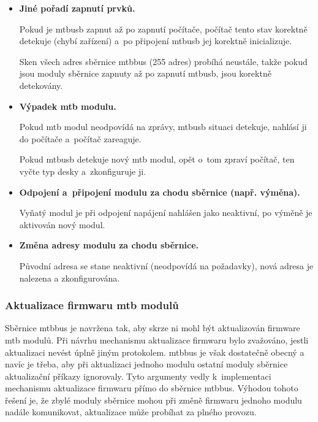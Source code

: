 \begin{itemize}
\item \textbf{Jiné pořadí zapnutí prvků.}

Pokud je \gls{mtbusb} zapnut až po zapnutí počítače, počítač tento stav
korektně detekuje (chybí zařízení) a~po připojení \gls{mtbusb} jej korektně
inicializuje.

Sken všech adres sběrnice \gls{mtbbus} (255 adres) probíhá neustále, takže
pokud jsou moduly sběrnice zapnuty až po zapnutí \gls{mtbusb}, jsou korektně
detekovány.

\item \textbf{Výpadek \gls{mtb} modulu.}

Pokud \gls{mtb} modul neodpovídá na zprávy, \gls{mtbusb} situaci detekuje,
nahlásí ji do počítače a~počítač zareaguje.

Pokud \gls{mtbusb} detekuje nový \gls{mtb} modul, opět o~tom zpraví
počítač, ten vyčte typ desky a~zkonfiguruje ji.

\item \textbf{Odpojení a~připojení modulu za chodu sběrnice (např. výměna).}

Vyňatý modul je při odpojení napájení nahlášen jako neaktivní, po výměně je
aktivován nový modul.

\item \textbf{Změna adresy modulu za chodu sběrnice.}

Původní adresa se stane neaktivní (neodpovídá na požadavky), nová adresa
je nalezena a zkonfigurována.

\end{itemize}


\subsubsection{\textbf{Aktualizace firmwaru \gls{mtb} modulů}} \label{subsub:fw_uprage}

Sběrnice \gls{mtbbus} je navržena tak, aby skrze ni mohl být aktualizován
firmware \gls{mtb} modulů. Při návrhu mechanismu aktualizace firmwaru bylo
zvažováno, jestli aktualizaci nevést úplně jiným protokolem.
\mbox{\gls{mtbbus}} je však dostatečně obecný a navíc je třeba, aby
při aktualizaci jednoho modulu ostatní moduly sběrnice aktualizační příkazy
ignorovaly. Tyto argumenty vedly k~implementaci
mechanismu aktualizace firmwaru přímo do sběrnice \gls{mtbbus}. Výhodou tohoto
řešení je, že zbylé moduly sběrnice mohou při změně firmwaru jednoho
modulu nadále komunikovat, aktualizace může probíhat za plného provozu.

